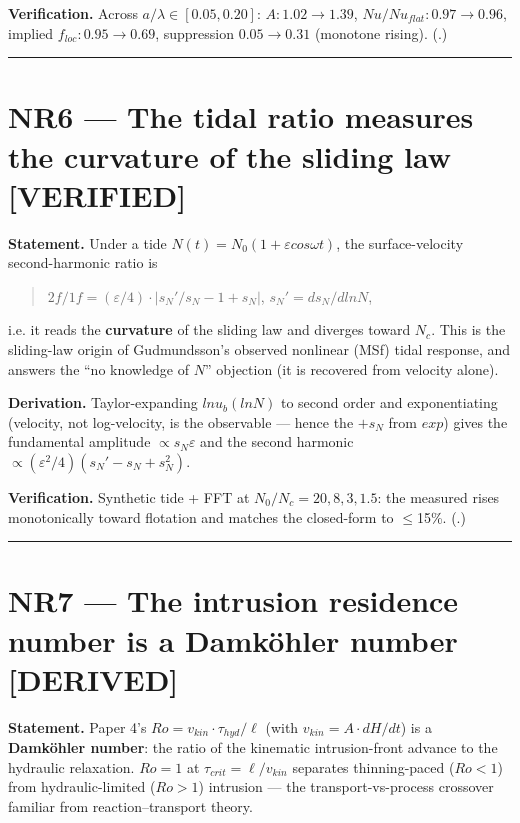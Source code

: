 \documentclass[11pt]{article}
\newcommand{\ctV}[1]{{\small\textbf{\textcolor{cVer}{[VERIFIED#1]}}}}
\newcommand{\ctD}[1]{{\small\textbf{\textcolor{cDer}{[DERIVED#1]}}}}
\begin{document}
\textbf{Verification.} Across $a/\lambda \in [0.05,0.20]$: $A: 1.02\to 1.39$, $Nu/Nu_{flat}: 0.97\to 0.96$, implied $f_{loc}: 0.95\to 0.69$, suppression $0.05\to 0.31$ (monotone rising). (.)


\medskip\hrule\medskip


\section*{NR6 — The tidal  ratio measures the curvature of the sliding law \ctV{}}


\textbf{Statement.} Under a tide $N(t)=N_{0}(1+\varepsilon  cos \omega t)$, the surface-velocity second-harmonic ratio is


\begin{quote}
$2f/1f = (\varepsilon /4) \cdot  |s_{N}'/s_{N} - 1 + s_{N}|$,   $s_{N}' = d s_{N}/d ln N$,
\end{quote}


i.e. it reads the \textbf{curvature} of the sliding law and diverges toward $N_{c}$. This is the sliding-law origin of Gudmundsson's observed nonlinear (MSf) tidal response, and answers the ``no knowledge of $N$'' objection (it is recovered from velocity alone).


\textbf{Derivation.} Taylor-expanding $ln u_{b}(ln N)$ to second order and exponentiating (velocity, not log-velocity, is the observable — hence the $+s_{N}$ from $exp$) gives the fundamental amplitude $\propto  s_{N} \varepsilon $ and the second harmonic $\propto  (\varepsilon ^{2}/4)(s_{N}'-s_{N}+s_{N}^{2})$.


\textbf{Verification.} Synthetic tide + FFT at $N_{0}/N_{c} = 20,8,3,1.5$: the measured  rises monotonically toward flotation and matches the closed-form to \ensuremath{\le}15\%. (.)


\medskip\hrule\medskip


\section*{NR7 — The intrusion residence number is a Damköhler number \ctD{}}


\textbf{Statement.} Paper 4's $Ro = v_{kin}\cdot \tau _{hyd}/\ell $ (with $v_{kin} = A\cdot dH/dt$) is a \textbf{Damköhler number}: the ratio of the kinematic intrusion-front advance to the hydraulic relaxation. $Ro=1$ at $\tau _{crit} = \ell /v_{kin}$ separates thinning-paced ($Ro<1$) from hydraulic-limited ($Ro>1$) intrusion — the transport-vs-process crossover familiar from reaction–transport theory.
\end{document}
